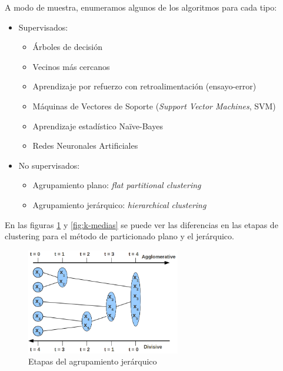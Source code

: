 A modo de muestra, enumeramos algunos de los algoritmos para cada tipo:
\nopagebreak
\begin{itemize}
\item Supervisados:
\begin{itemize}
\item Árboles de decisión
\item Vecinos más cercanos
\item Aprendizaje por refuerzo con retroalimentación (ensayo-error)
\item Máquinas de Vectores de Soporte (\emph{Support Vector Machines}, SVM)
\item Aprendizaje estadístico Naïve-Bayes
\item Redes Neuronales Artificiales
\end{itemize}
\item No supervisados:
\begin{itemize}
\item Agrupamiento plano: \emph{flat partitional clustering}
\item Agrupamiento jerárquico: \emph{hierarchical clustering}
\end{itemize}
\end{itemize}

En las figuras \ref{fig:hier-clustering} y \ref{fig:k-medias} se puede ver las diferencias en las etapas de clustering para el método de particionado plano y el jerárquico.

\begin{figure}[htbp]
\centering
\includegraphics[width=0.6\textwidth]{hierarchical-clustering}
\caption[Etapas del agrupamiento jerárquico]{Etapas del agrupamiento jerárquico \citep{Rai2011}}
\label{fig:hier-clustering}
\end{figure}

